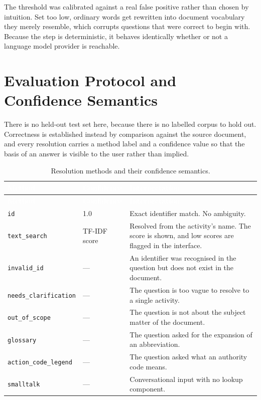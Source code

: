 The threshold was calibrated against a real false positive rather than chosen by intuition. Set too low, ordinary words get rewritten into document vocabulary they merely resemble, which corrupts questions that were correct to begin with. Because the step is deterministic, it behaves identically whether or not a language model provider is reachable.

\section{Evaluation Protocol and Confidence Semantics}

There is no held-out test set here, because there is no labelled corpus to hold out. Correctness is established instead by comparison against the source document, and every resolution carries a method label and a confidence value so that the basis of an answer is visible to the user rather than implied.

\begin{longtable}{|p{}|p{}|p{}|}
\caption{Resolution methods and their confidence semantics.}\label{tab:methods}\\
\hline
\rowcolor{myblue}\textcolor{white}{\textbf{Method}} & \textcolor{white}{\textbf{Confidence}} & \textcolor{white}{\textbf{Interpretation}} \\
\hline
\endfirsthead
\hline
\rowcolor{myblue}\textcolor{white}{\textbf{Method}} & \textcolor{white}{\textbf{Confidence}} & \textcolor{white}{\textbf{Interpretation}} \\
\hline
\endhead
\texttt{id} & 1.0 & Exact identifier match. No ambiguity. \\ \hline
\texttt{text\_search} & TF-IDF score & Resolved from the activity's name. The score is shown, and low scores are flagged in the interface. \\ \hline
\texttt{invalid\_id} & --- & An identifier was recognised in the question but does not exist in the document. \\ \hline
\texttt{needs\_clarification} & --- & The question is too vague to resolve to a single activity. \\ \hline
\texttt{out\_of\_scope} & --- & The question is not about the subject matter of the document. \\ \hline
\texttt{glossary} & --- & The question asked for the expansion of an abbreviation. \\ \hline
\texttt{action\_code\_legend} & --- & The question asked what an authority code means. \\ \hline
\texttt{smalltalk} & --- & Conversational input with no lookup component. \\ \hline
\end{longtable}

